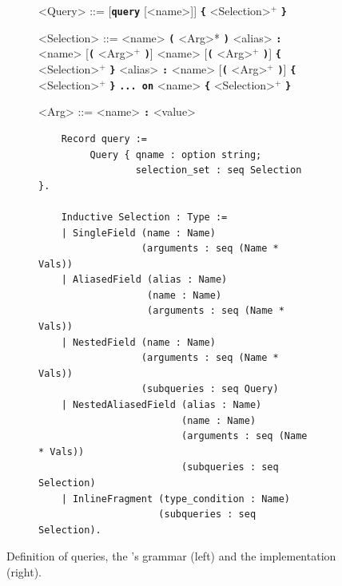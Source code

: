 \begin{figure}[h]
  \centering
  \begin{subfigure}{.5\textwidth}
    \begin{grammar}
    		<Query> ::= [\textbf{\texttt{query}} [<name>]] \textbf{\texttt{\{}} <Selection>$^{+}$ \textbf{\texttt{\}}}
		
        <Selection> ::= <name> \textbf{\texttt{(}} <Arg>* \textbf{\texttt{)}}
        \alt <alias> \textbf{\texttt{:}} <name> [\textbf{\texttt{(}} <Arg>$^{+}$ \textbf{\texttt{)}}]
        \alt <name> [\textbf{\texttt{(}} <Arg>$^{+}$ \textbf{\texttt{)}}] \textbf{\texttt{\{}} <Selection>$^{+}$ \textbf{\texttt{\}}}
        \alt <alias> \textbf{\texttt{:}} <name> [\textbf{\texttt{(}} <Arg>$^{+}$ \textbf{\texttt{)}}] \textbf{\texttt{\{}} <Selection>$^{+}$ \textbf{\texttt{\}}}
        \alt \textbf{\texttt{... on}} <name> \textbf{\texttt{\{}} <Selection>$^{+}$ \textbf{\texttt{\}}}
        
        <Arg> ::= <name> \textbf{\texttt{:}} <value>
    \end{grammar}
  \end{subfigure}%
  \begin{subfigure}{.5\textwidth}

    \begin{verbatim}
    Record query := 
         Query { qname : option string; 
                 selection_set : seq Selection }.
                   
    Inductive Selection : Type :=
    | SingleField (name : Name)
                  (arguments : seq (Name * Vals))
    | AliasedField (alias : Name)
                   (name : Name)
                   (arguments : seq (Name * Vals))
    | NestedField (name : Name)
                  (arguments : seq (Name * Vals))
                  (subqueries : seq Query)
    | NestedAliasedField (alias : Name)
                         (name : Name)
                         (arguments : seq (Name * Vals))
                         (subqueries : seq Selection)
    | InlineFragment (type_condition : Name)
                     (subqueries : seq Selection).
    \end{verbatim}
  \end{subfigure}
  \caption{Definition of \gql queries, the \spec's grammar (left) and the \coq implementation (right).}
  \label{fig:query_def}
\end{figure}

